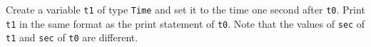 Create a variable \texttt{t1} of type \texttt{Time} and set it to the time one second after \texttt{t0}. Print \texttt{t1} in the same format as the print statement of \texttt{t0}. Note that the values of \texttt{sec} of \texttt{t1} and \texttt{sec} of \texttt{t0} are different.

